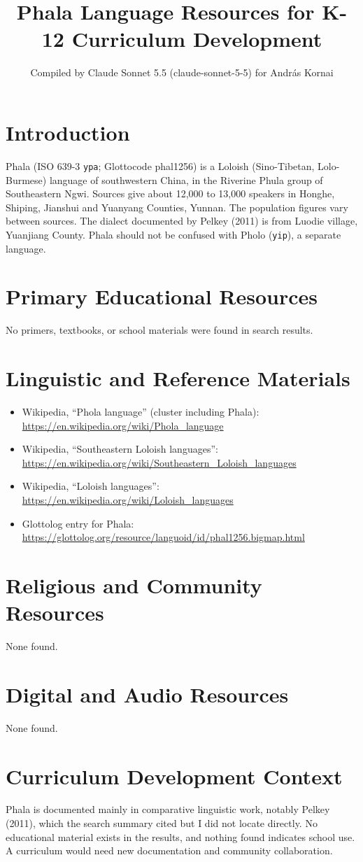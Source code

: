 \documentclass[12pt]{article}
\title{Phala Language Resources for K-12 Curriculum Development}
\author{Compiled by Claude Sonnet 5.5 (claude-sonnet-5-5) for Andr\'as Kornai}
\date{}
\begin{document}
\maketitle

\section{Introduction}
Phala (ISO 639-3 \texttt{ypa}; Glottocode phal1256) is a Loloish (Sino-Tibetan, Lolo-Burmese) language of southwestern China, in the Riverine Phula group of Southeastern Ngwi. Sources give about 12,000 to 13,000 speakers in Honghe, Shiping, Jianshui and Yuanyang Counties, Yunnan. The population figures vary between sources. The dialect documented by Pelkey (2011) is from Luodie village, Yuanjiang County. Phala should not be confused with Pholo (\texttt{yip}), a separate language.

\section{Primary Educational Resources}
No primers, textbooks, or school materials were found in search results.

\section{Linguistic and Reference Materials}
\begin{itemize}
\item Wikipedia, ``Phola language'' (cluster including Phala): \url{https://en.wikipedia.org/wiki/Phola_language}
\item Wikipedia, ``Southeastern Loloish languages'': \url{https://en.wikipedia.org/wiki/Southeastern_Loloish_languages}
\item Wikipedia, ``Loloish languages'': \url{https://en.wikipedia.org/wiki/Loloish_languages}
\item Glottolog entry for Phala: \url{https://glottolog.org/resource/languoid/id/phal1256.bigmap.html}
\end{itemize}

\section{Religious and Community Resources}
None found.

\section{Digital and Audio Resources}
None found.

\section{Curriculum Development Context}
Phala is documented mainly in comparative linguistic work, notably Pelkey (2011), which the search summary cited but I did not locate directly. No educational material exists in the results, and nothing found indicates school use. A curriculum would need new documentation and community collaboration.
\end{document}
